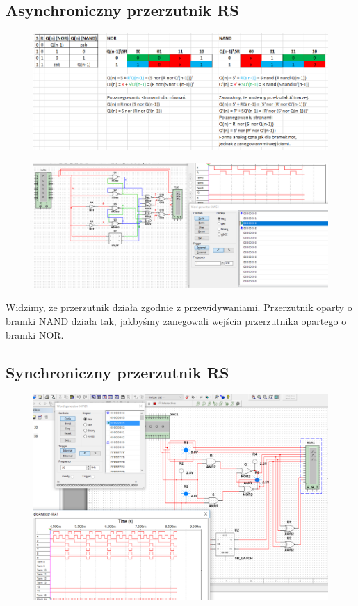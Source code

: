 \documentclass[12pt,a4paper]{article}
\begin{document}
\subsection{Asynchroniczny przerzutnik RS}
\begin{figure}[H]
\centering
\includegraphics[width=\textwidth]{img/3a_karnaugh}
\end{figure}
\begin{figure}[H]
\centering
\includegraphics[width=\textwidth]{img/3a}
\end{figure}

Widzimy, że przerzutnik działa zgodnie z przewidywaniami. Przerzutnik oparty o bramki NAND działa tak, jakbyśmy zanegowali wejścia przerzutnika opartego o bramki NOR.

\subsection{Synchroniczny przerzutnik RS}
\begin{figure}[H]
\centering
\includegraphics[width=\textwidth]{img/3b}
\end{figure}
\end{document}
